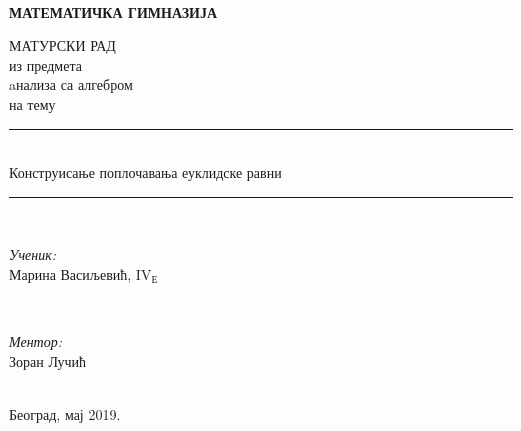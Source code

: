 \documentclass[12pt]{report}
\begin{document}
\newcommand{\HRule}{\rule{\linewidth}{0.5mm}} %

\thispagestyle{empty}
\\
\centerline{\LARGE \textbf{МАТЕМАТИЧКА ГИМНАЗИЈА}}

\vspace*{40mm}
\begin{center}
{\Large МАТУРСКИ РАД}\\
{\Large	из предмета}\\
{\Large	aнализа са алгебром}\\
{\Large	на тему}
\Huge\HRule\\[0.4cm] %
	{Конструисање поплочавања еуклидске равни}\\
	\HRule \\[20pt] %
\begin{minipage}{0.4\textwidth}
\begin{flushleft} \large
\emph{\Large Ученик:}\\
{\Large Марина Васиљевић}, IV$_\text{Е}$\\
\end{flushleft}
\end{minipage}
~
\begin{minipage}{0.4\textwidth}
\begin{flushright} \large
\vspace{0.5cm}
\emph{\Large Ментор:} \\
{\Large Зоран Лучић}\\ 
\end{flushright}
\end{minipage}\\[8cm]
\Large{Београд, мај 2019.}
\end{center}

\tableofcontents

\thispagestyle{empty}

\clearpage
\setcounter{page}{1}
\end{document}
